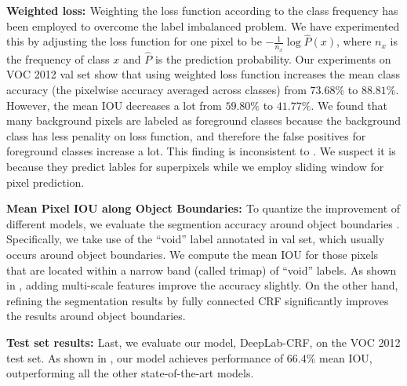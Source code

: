 {\bf{Weighted loss: }} Weighting the loss function according to the class frequency has been employed to overcome the label imbalanced problem. We have experimented this by adjusting the loss function for one pixel to be $-\frac{1}{n_{x}} \log \hat{P}(x)$, where $n_x$ is the frequency of class $x$ and $\hat{P}$ is the prediction probability. Our experiments on VOC 2012 val set show that using weighted loss function increases the mean class accuracy (the pixelwise accuracy averaged across classes) from $73.68\%$ to $88.81\%$. However, the mean IOU decreases a lot from $59.80\%$ to $41.77\%$. We found that many background pixels are labeled as foreground classes because the background class has less penality on loss function, and therefore the false positives for foreground classes increase a lot. This finding is inconsistent to \citet{mostajabi2014feedforward}. We suspect it is because they predict lables for superpixels while we employ sliding window for pixel prediction.

{\bf{Mean Pixel IOU along Object Boundaries: }}
To quantize the improvement of different models, we evaluate the segmention accuracy around object boundaries \citep{kohli2009robust, krahenbuhl2011efficient}. Specifically, we take use of the ``void'' label annotated in val set, which usually occurs around object boundaries. We compute the mean IOU for those pixels that are located within a narrow band (called trimap) of ``void'' labels. As shown in , adding multi-scale features improve the accuracy slightly. On the other hand, refining the segmentation results by fully connected CRF significantly improves the results around object boundaries. 

{\bf{Test set results: }} Last, we evaluate our model, DeepLab-CRF, on the VOC 2012 test set. As shown in , our model achieves performance of $66.4\%$ mean IOU, outperforming all the other state-of-the-art models. 


